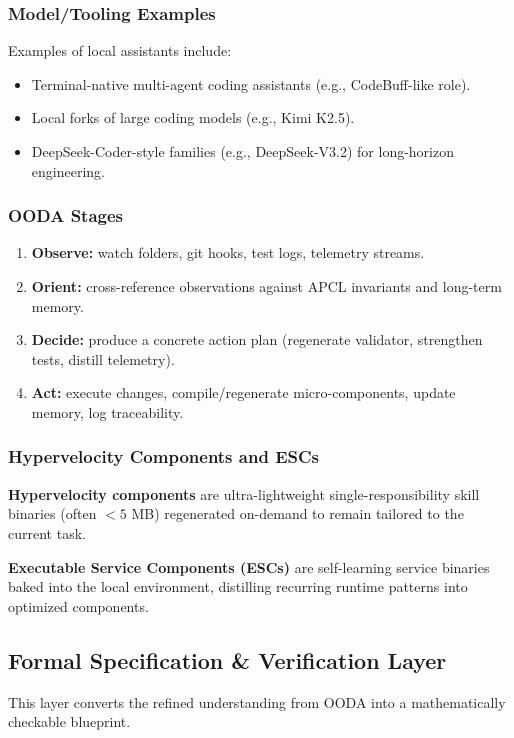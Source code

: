 \documentclass[11pt]{article}
\begin{document}
\subsubsection{Model/Tooling Examples}
Examples of local assistants include:
\begin{itemize}
  \item Terminal-native multi-agent coding assistants (e.g., CodeBuff-like role).
  \item Local forks of large coding models (e.g., Kimi K2.5).
  \item DeepSeek-Coder-style families (e.g., DeepSeek-V3.2) for long-horizon engineering.
\end{itemize}

\subsubsection{OODA Stages}
\begin{enumerate}[leftmargin=2em]
  \item \textbf{Observe:} watch folders, git hooks, test logs, telemetry streams.
  \item \textbf{Orient:} cross-reference observations against APCL invariants and long-term memory.
  \item \textbf{Decide:} produce a concrete action plan (regenerate validator, strengthen tests, distill telemetry).
  \item \textbf{Act:} execute changes, compile/regenerate micro-components, update memory, log traceability.
\end{enumerate}

\subsubsection{Hypervelocity Components and ESCs}
\textbf{Hypervelocity components} are ultra-lightweight single-responsibility skill binaries (often $<5$ MB)
regenerated on-demand to remain tailored to the current task.

\textbf{Executable Service Components (ESCs)} are self-learning service binaries baked into the local environment,
distilling recurring runtime patterns into optimized components.

\subsection{Formal Specification \& Verification Layer}

This layer converts the refined understanding from OODA into a mathematically checkable blueprint.
\end{document}
